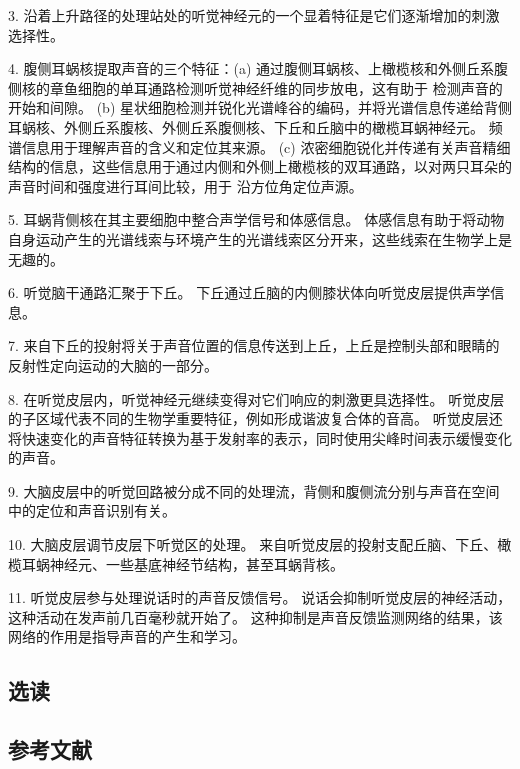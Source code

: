 3. 沿着上升路径的处理站处的听觉神经元的一个显着特征是它们逐渐增加的刺激选择性。 

4. 腹侧耳蜗核提取声音的三个特征：(a) 通过腹侧耳蜗核、上橄榄核和外侧丘系腹侧核的章鱼细胞的单耳通路检测听觉神经纤维的同步放电，这有助于 检测声音的开始和间隙。 (b) 星状细胞检测并锐化光谱峰谷的编码，并将光谱信息传递给背侧耳蜗核、外侧丘系腹核、外侧丘系腹侧核、下丘和丘脑中的橄榄耳蜗神经元。 频谱信息用于理解声音的含义和定位其来源。 (c) 浓密细胞锐化并传递有关声音精细结构的信息，这些信息用于通过内侧和外侧上橄榄核的双耳通路，以对两只耳朵的声音时间和强度进行耳间比较，用于 沿方位角定位声源。 

5. 耳蜗背侧核在其主要细胞中整合声学信号和体感信息。 体感信息有助于将动物自身运动产生的光谱线索与环境产生的光谱线索区分开来，这些线索在生物学上是无趣的。 

6. 听觉脑干通路汇聚于下丘。 下丘通过丘脑的内侧膝状体向听觉皮层提供声学信息。 

7. 来自下丘的投射将关于声音位置的信息传送到上丘，上丘是控制头部和眼睛的反射性定向运动的大脑的一部分。 

8. 在听觉皮层内，听觉神经元继续变得对它们响应的刺激更具选择性。 听觉皮层的子区域代表不同的生物学重要特征，例如形成谐波复合体的音高。 听觉皮层还将快速变化的声音特征转换为基于发射率的表示，同时使用尖峰时间表示缓慢变化的声音。 

9. 大脑皮层中的听觉回路被分成不同的处理流，背侧和腹侧流分别与声音在空间中的定位和声音识别有关。 

10. 大脑皮层调节皮层下听觉区的处理。 来自听觉皮层的投射支配丘脑、下丘、橄榄耳蜗神经元、一些基底神经节结构，甚至耳蜗背核。 

11. 听觉皮层参与处理说话时的声音反馈信号。 说话会抑制听觉皮层的神经活动，这种活动在发声前几百毫秒就开始了。 这种抑制是声音反馈监测网络的结果，该网络的作用是指导声音的产生和学习。


\subsection{选读}
\subsection{参考文献}
